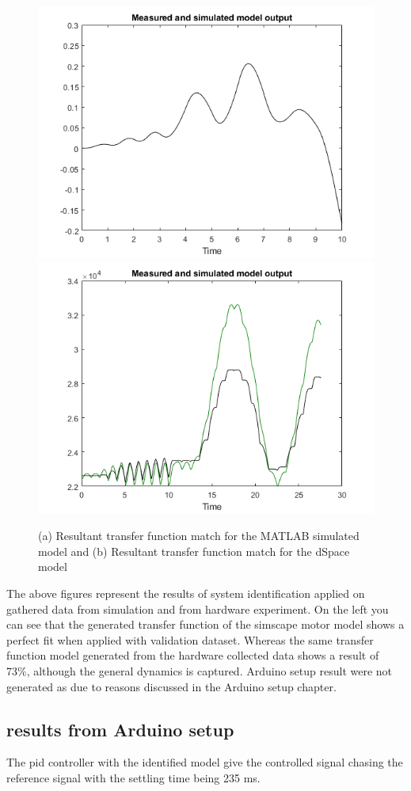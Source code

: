 \documentclass[]{final_report}
\begin{document}
\begin{figure} [h!]
\centerline{\includegraphics[width=.45\textwidth]{Screenshots for paper/matlab models/simulation_transfer_function_sys_ident.png}
{\includegraphics[width=.45\textwidth]{Screenshots for paper/dSpace/hardware_test_sys_ident.png}}
}
\caption{(a) Resultant transfer function match for the MATLAB simulated model and (b) Resultant transfer function match for the dSpace model }
\label{fig:tfresultsim2}
\end{figure}


The above figures represent the results of system identification applied on gathered data from simulation and from hardware experiment. On the left you can see that the generated transfer function of the simscape motor model shows a perfect fit when applied with validation dataset. Whereas the same transfer function model generated from the hardware collected data shows a result of 73\%, although the general dynamics is captured. Arduino setup result were not generated as due to reasons discussed in the Arduino setup chapter. 

\subsection{results from Arduino setup}
The pid controller with the identified model give the controlled signal chasing the reference signal with the settling time being 235 ms.
\end{document}
